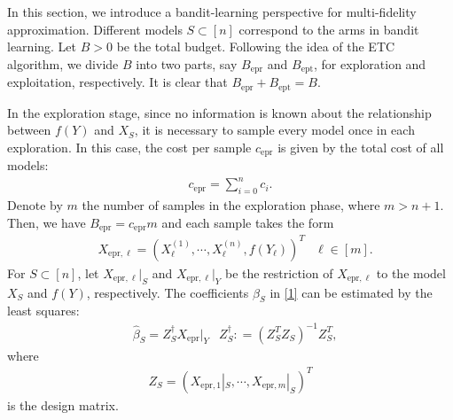 \documentclass[a4paper,11pt]{article}
\numberwithin{equation}{section}
\theoremstyle{plain}
\theoremstyle{definition}
\def\ex{{\text{epr}}}
\def\ext{{\text{ept}}}
\begin{document}
In this section, we introduce a bandit-learning perspective for multi-fidelity approximation.
Different models $S\subset [n]$ correspond to the arms in bandit learning. 
Let $B>0$ be the total budget. 
Following the idea of the ETC algorithm, we divide $B$ into two parts, say $B_{\ex}$ and $B_{\ext}$, for exploration and exploitation, respectively.  
It is clear that $B_{\ex}+B_{\ext} = B$. 

In the exploration stage, since no information is known about the relationship between $f(Y)$ and $X_S$, it is necessary to sample every model once in each exploration.  
In this case, the cost per sample $c_{\ex}$ is given by the total cost of all models: 
\begin{align*}
c_{\ex} = \sum_{i=0}^nc_i.
\end{align*}
Denote by $m$ the number of samples in the exploration phase, where $m> n+1$. 
Then, we have $B_{\ex} = c_{\ex} m$ and each sample takes the form
\begin{align*}
&X_{\ex,\ell} =\left (X^{(1)}_\ell, \cdots, X^{(n)}_\ell, f(Y_\ell)\right)^T& \ell\in [m]. 
\end{align*}
For $S\subset [n]$, let $X_{\ex,\ell}|_S$ and $X_{\ex,\ell}|_Y$ be the restriction of $X_{\ex,\ell}$ to the model $X_S$ and $f(Y)$, respectively. The coefficients $\beta_S$ in \eqref{1} can be estimated by the least squares:
\begin{align}
&\widehat{\beta}_S= Z_S^\dagger X_\ex|_Y &Z_S^\dagger: =  \left(Z_S^TZ_S\right)^{-1}Z_S^T,\label{lscoef}
\end{align} 
where 
\begin{align*}
Z_S = \left(X_{\ex, 1}|_S, \cdots, X_{\ex, m}|_S\right)^T
\end{align*}
is the design matrix.
\end{document}
